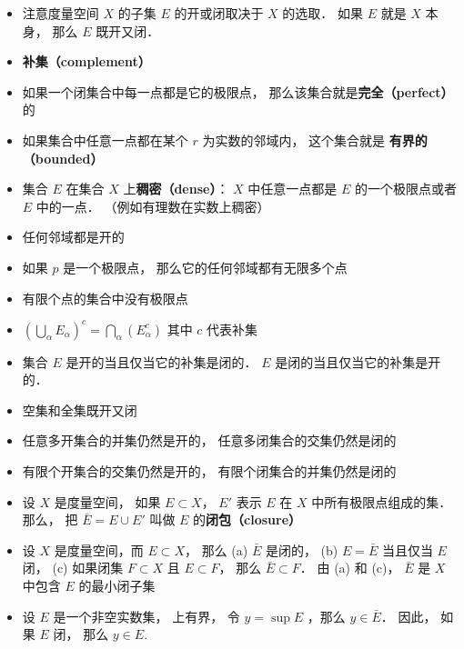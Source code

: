 \begin{itemize}
\item 注意度量空间 $X$ 的子集 $E$ 的开或闭取决于 $X$ 的选取． 如果 $E$ 就是 $X$ 本身， 那么 $E$ 既开又闭．

\item \textbf{补集（complement）}

\item 如果一个闭集合中每一点都是它的极限点， 那么该集合就是\textbf{完全（perfect）} 的

\item 如果集合中任意一点都在某个 $r$ 为实数的邻域内， 这个集合就是 \textbf{有界的（bounded）}

\item 集合 $E$ 在集合 $X$ 上\textbf{稠密（dense）}： $X$ 中任意一点都是 $E$ 的一个极限点或者 $E$ 中的一点． （例如有理数在实数上稠密）

\item 任何邻域都是开的

\item 如果 $p$ 是一个极限点， 那么它的任何邻域都有无限多个点

\item 有限个点的集合中没有极限点

\item $(\bigcup_\alpha E_\alpha)^c = \bigcap_\alpha (E_\alpha^c)$ 其中 $c$ 代表补集

\item 集合 $E$ 是开的当且仅当它的补集是闭的． $E$ 是闭的当且仅当它的补集是开的．

\item 空集和全集既开又闭

\item 任意多开集合的并集仍然是开的， 任意多闭集合的交集仍然是闭的

\item 有限个开集合的交集仍然是开的， 有限个闭集合的并集仍然是闭的

\item 设 $X$ 是度量空间， 如果 $E \subset X$， $E'$ 表示 $E$ 在 $X$ 中所有极限点组成的集． 那么， 把 $\bar E = E \cup E'$ 叫做 $E$ 的\textbf{闭包（closure）}

\item 设 $X$ 是度量空间，而 $E \subset X$， 那么 (a) $\bar E$ 是闭的， (b) $E = \bar E$ 当且仅当 $E$ 闭， (c) 如果闭集 $F \subset X$ 且 $E \subset F$， 那么 $\bar E \subset F$． 由 (a) 和 (c)， $\bar E$ 是 $X$ 中包含 $E$ 的最小闭子集

\item 设 $E$ 是一个非空实数集， 上有界， 令 $y = \sup E$ ，那么 $y \in \bar E$．
因此， 如果 $E$ 闭， 那么 $y \in E$.


\end{itemize}
